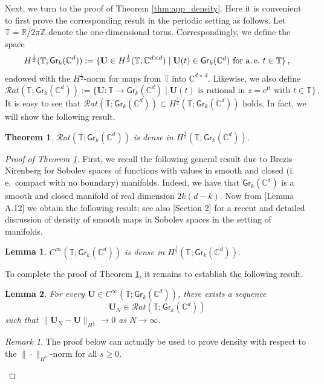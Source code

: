 \documentclass[11pt,reqno]{amsart}
\newtheorem{lem}{Lemma}[section]
\newtheorem{thm}{Theorem}[section]
\theoremstyle{definition}
\theoremstyle{remark}
\theoremstyle{remark}
\newtheorem*{remark*}{Remark}
\numberwithin{equation}{section}
\newcommand{\C}{\mathbb{C}}
\newcommand{\Z}{\mathbb{Z}}
\newcommand{\R}{\mathbb{R}}
\newcommand{\T}{\mathbb{T}}
\newcommand{\ii}{\mathrm{i}}
\newcommand{\eu}{\mathrm{e}}
\newcommand{\Ub}{\mathbf{U}}
\newcommand{\Gr}{\mathsf{Gr}}
\begin{document}
\begin{appendix}
Next, we turn to the proof of Theorem \ref{thm:app_density}. Here it is convenient to first prove the corresponding result in the periodic setting as follows. Let $\T = \R/2 \pi \Z$ denote the one-dimensional torus. Correspondingly, we define the space
$$
H^{\frac 1 2}(\T; \Gr_k(\C^d)) := \{ \Ub \in H^{\frac 1 2}(\T; \C^{d \times d}) \mid \mbox{$\Ub(t) \in \Gr_k(\C^d)$ for a.\,e.~$t \in \T$} \} \, ,
$$
endowed with the $H^{\frac 1 2}$-norm for maps from $\T$ into $\C^{d \times d}$. Likewise, we also define
$$
\mathcal{R}at(\T; \Gr_k(\C^d)) := \{ \Ub : \T \to \Gr_k(\C^d) \mid \mbox{$\Ub(t)$ is rational in $z = \eu^{\ii t}$ with $t \in \T$} \} \, .
$$
It is easy to see that $\mathcal{R}at(\T; \Gr_k(\C^d)) \subset H^{\frac 1 2}(\T; \Gr_k(\C^d))$ holds. In fact, we will show the following result.

\begin{thm} \label{thm:dense_torus}
$\mathcal{R}at(\T; \Gr_k(\C^d))$ is dense in $H^{\frac 1 2}(\T; \Gr_k(\C^d))$. 
\end{thm}

\begin{proof}[Proof of Theorem \ref{thm:dense_torus}]
First, we recall the following general result due to Brezis--Nirenberg \cite{BrNi-95} for Sobolev spaces of functions with values in smooth and closed (i.\,e.~compact with no boundary) manifolds. Indeed, we have that $\Gr_k(\C^d)$ is a smooth and closed manifold of real dimension $2k(d-k)$. Now from \cite{BrNi-95}[Lemma A.12] we obtain the following result; see also \cite{MaSc-23}[Section 2] for a recent and detailed discussion of density of smooth maps in Sobolev spaces in the setting of manifolds.

\begin{lem} \label{lem:VMO}
$C^\infty(\T; \Gr_k(\C^d))$ is dense in $H^{\frac 1 2}(\T; \Gr_k(\C^d))$.
\end{lem}

To complete the proof of Theorem \ref{thm:dense_torus}, it remains to establish the following result.

\begin{lem} \label{lem:rational}
For every $\Ub \in C^\infty(\T; \Gr_k(\C^d))$, there exists a sequence $$\Ub_N \in \mathcal{R}at(\T; \Gr_k(\C^d))$$ such that $\| \Ub_N - \Ub \|_{H^{\frac 1 2}} \to 0$ as $N \to \infty$. 
\end{lem}

\begin{remark*}
The proof below can actually be used to prove density with respect to the $\| \cdot \|_{H^s}$-norm for all $s \geq 0$.
\end{remark*}


\end{proof}
\end{appendix}
\end{document}
